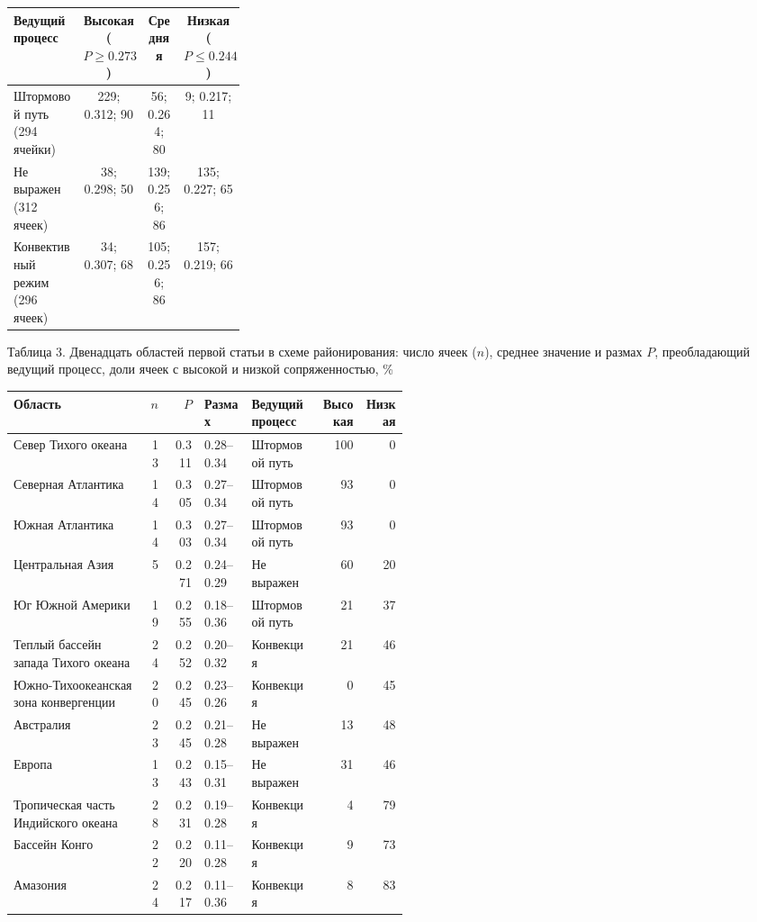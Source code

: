 \documentclass[12pt,a4paper]{article}
\begin{document}
\begin{singlespace}
\noindent\begin{tabular}{@{}>{\raggedright\arraybackslash}p{0.30\linewidth}ccc@{}}
\toprule
Ведущий процесс & Высокая ($P \ge 0.273$) & Средняя & Низкая ($P \le 0.244$)\\
\midrule
Штормовой путь (294 ячейки) & 229; 0.312; 90 & 56; 0.264; 80 & 9; 0.217; 11\\
Не выражен (312 ячеек) & 38; 0.298; 50 & 139; 0.256; 86 & 135; 0.227; 65\\
Конвективный режим (296 ячеек) & 34; 0.307; 68 & 105; 0.256; 86 & 157; 0.219; 66\\
\bottomrule
\end{tabular}
\end{singlespace}

\clearpage
\noindent Таблица 3. Двенадцать областей первой статьи в схеме районирования: число ячеек ($n$), среднее значение и размах $P$, преобладающий ведущий процесс, доли ячеек с высокой и низкой сопряженностью, \%

\begin{singlespace}
\noindent\begin{tabular}{@{}>{\raggedright\arraybackslash}p{0.34\linewidth}rrl>{\raggedright\arraybackslash}p{0.17\linewidth}rr@{}}
\toprule
Область & $n$ & $P$ & Размах & Ведущий процесс & Высокая & Низкая\\
\midrule
Север Тихого океана & 13 & 0.311 & 0.28--0.34 & Штормовой путь & 100 & 0\\
Северная Атлантика & 14 & 0.305 & 0.27--0.34 & Штормовой путь & 93 & 0\\
Южная Атлантика & 14 & 0.303 & 0.27--0.34 & Штормовой путь & 93 & 0\\
Центральная Азия & 5 & 0.271 & 0.24--0.29 & Не выражен & 60 & 20\\
Юг Южной Америки & 19 & 0.255 & 0.18--0.36 & Штормовой путь & 21 & 37\\
Теплый бассейн запада Тихого океана & 24 & 0.252 & 0.20--0.32 & Конвекция & 21 & 46\\
Южно-Тихоокеанская зона конвергенции & 20 & 0.245 & 0.23--0.26 & Конвекция & 0 & 45\\
Австралия & 23 & 0.245 & 0.21--0.28 & Не выражен & 13 & 48\\
Европа & 13 & 0.243 & 0.15--0.31 & Не выражен & 31 & 46\\
Тропическая часть Индийского океана & 28 & 0.231 & 0.19--0.28 & Конвекция & 4 & 79\\
Бассейн Конго & 22 & 0.220 & 0.11--0.28 & Конвекция & 9 & 73\\
Амазония & 24 & 0.217 & 0.11--0.36 & Конвекция & 8 & 83\\
\bottomrule
\end{tabular}
\end{singlespace}
\end{document}
